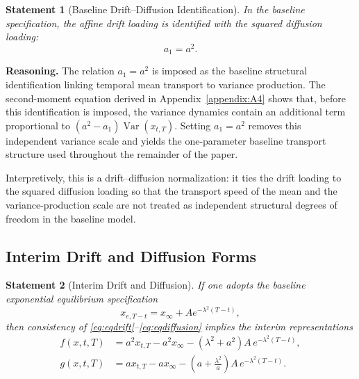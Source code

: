 \documentclass[12pt]{article}
\theoremstyle{statementstyle}
\newtheorem{statement}{Statement}[section]
\begin{document}
\begin{statement}[Baseline Drift--Diffusion Identification]
\label{stmt:a1eqasq}
\emph{
In the baseline specification, the affine drift loading is identified with the
squared diffusion loading:
}
\[
a_{1}=a^{2}.
\tag{3.4.1}
\]
\end{statement}

\medskip

\noindent\textbf{Reasoning.}
The relation \(a_{1}=a^{2}\) is imposed as the baseline structural
identification linking temporal mean transport to variance production. The
second-moment equation derived in Appendix~\ref{appendix:A4} shows that, before
this identification is imposed, the variance dynamics contain an additional term
proportional to \((a^{2}-a_{1})\operatorname{Var}(x_{t,T})\). Setting
\(a_{1}=a^{2}\) removes this independent variance scale and yields the
one-parameter baseline transport structure used throughout the remainder of the
paper.

Interpretively, this is a drift--diffusion normalization: it ties the drift
loading to the squared diffusion loading so that the transport speed of the mean
and the variance-production scale are not treated as independent structural
degrees of freedom in the baseline model.

\subsection{Interim Drift and Diffusion Forms}

\begin{statement}[Interim Drift and Diffusion]
\label{stmt:interim}
\emph{
If one adopts the baseline exponential equilibrium specification
\[
x_{e,T-t}=x_{\infty}+A e^{-\lambda^{2}(T-t)},
\]
then consistency of \eqref{eq:eqdrift}--\eqref{eq:eqdiffusion} implies
the interim representations
}
\begin{align}
f(x,t,T)
&=
a^{2}x_{t,T}
-
a^{2}x_{\infty}
-
(\lambda^{2}+a^{2})A\, e^{-\lambda^{2}(T-t)},
\tag{3.5.1a}\label{eq:interim-f}\\[0.3em]
g(x,t,T)
&=
a x_{t,T}
-
a x_{\infty}
-
\left(a + \frac{\lambda^{2}}{a}\right)
A\,e^{-\lambda^{2}(T-t)}.
\tag{3.5.1b}\label{eq:interim-g}
\end{align}
\end{statement}

\medskip
\end{document}

